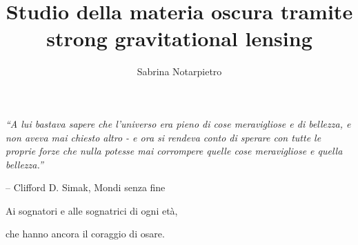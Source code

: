 \documentclass[twoside,12pt]{book}
\title{Studio della materia oscura tramite strong gravitational lensing}
\author{Sabrina Notarpietro}
\begin{document}
\frontmatter
\makecenteredfrontpage
\newpage \thispagestyle{empty} \null \newpage

% 
%

 {\raggedleft \normalsize \sl 
 ``A lui bastava sapere che l'universo era pieno di cose meravigliose e di bellezza, e non aveva mai chiesto altro - e ora si rendeva conto di sperare con tutte le proprie forze che nulla potesse mai corrompere quelle cose meravigliose e quella bellezza.''

 \bigskip

 \--- Clifford D. Simak, Mondi senza fine\par

\vspace{2cm}

Ai sognatori e alle sognatrici di ogni età,\par
che hanno ancora il coraggio di osare.\par}


\cleardoublepage
\beforepreface
% 
%


%
%
\afterpreface

\mainmatter
%







\appendix

\backmatter
%
%

\beforebibliography
\printbibliography
%
%


\end{document}

